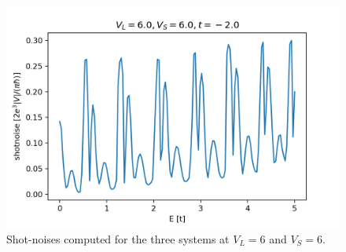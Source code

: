 \documentclass[12pt]{article}
\numberwithin{equation}{section}
\begin{document}
\begin{figure}
\begin{minipage}{0.333\textwidth}
    \includegraphics[width=1.0\textwidth]{./media/shotnoise_2deg_W8_L10_VL6_0_VS6_0.png} %
  \end{minipage}
  \caption{Shot-noises computed for the three systems at $V_L=6$ and $V_S=6$.}
\end{figure}
\end{document}
